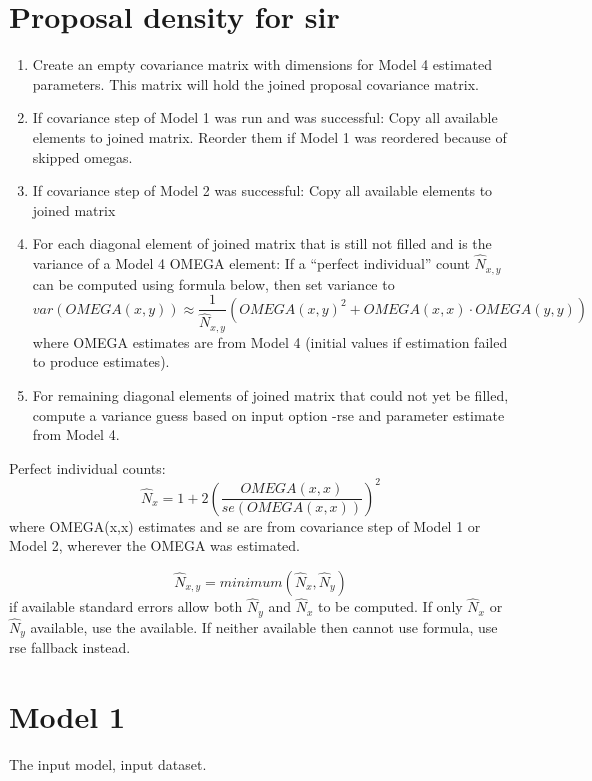 \section{Proposal density for sir}
\begin{enumerate}
\item Create an empty covariance matrix with dimensions for Model 4 estimated parameters.
This matrix will hold the joined proposal covariance matrix.
\item If covariance step of Model 1 was run and was successful: Copy all available
elements to joined matrix. Reorder them if Model 1 was reordered because of skipped omegas.
\item If covariance step of Model 2 was successful: Copy all available
elements to joined matrix
\item For each diagonal element of joined matrix that is still not filled and is
the variance of a Model 4 OMEGA element: If a ``perfect individual'' count $\hat{N}_{x,y}$ can
be computed using formula below, then set variance to
\[
var\left(OMEGA(x,y)\right)\approx \frac{1}{\hat{N}_{x,y}}
\left( OMEGA(x,y)^2 + OMEGA(x,x)\cdot OMEGA(y,y) \right)
\]
where OMEGA estimates are from Model 4 (initial values if estimation failed to produce estimates).
\item For remaining diagonal elements of joined matrix that could not yet be filled,
compute a variance guess based on input option -rse and parameter estimate from Model 4.
\end{enumerate}

Perfect individual counts:
\[
\hat{N}_{x}=1+2\left(\frac{OMEGA(x,x)}{se\left(OMEGA(x,x)\right)}\right)^2
\]
where OMEGA(x,x) estimates and se are from covariance step of Model 1 or Model 2, wherever the
OMEGA was estimated.

\[
\hat{N}_{x,y} = minimum(\hat{N}_{x}, \hat{N}_{y})
\] if available standard errors allow both $\hat{N}_{y}$ and $\hat{N}_{x}$ to be computed.
If only $\hat{N}_{x}$ or $\hat{N}_{y}$ available, use the available. If neither available then
cannot use formula, use rse fallback instead.


\section{Model 1}
The input model, input dataset.

